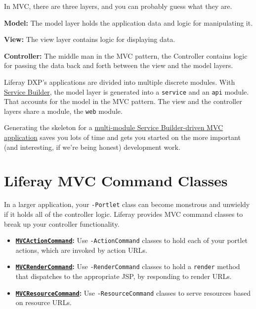 In MVC, there are three layers, and you can probably guess what they
are.

\textbf{Model:} The model layer holds the application data and logic for
manipulating it.

\textbf{View:} The view layer contains logic for displaying data.

\textbf{Controller:} The middle man in the MVC pattern, the Controller
contains logic for passing the data back and forth between the view and
the model layers.

Liferay DXP's applications are divided into multiple discrete modules.
With \href{/docs/7-2/appdev/-/knowledge_base/a/service-builder}{Service
Builder}, the model layer is generated into a \texttt{service} and an
\texttt{api} module. That accounts for the model in the MVC pattern. The
view and the controller layers share a module, the \texttt{web} module.

Generating the skeleton for a
\href{/docs/7-2/reference/-/knowledge_base/r/using-the-service-builder-template}{multi-module
Service Builder-driven MVC application} saves you lots of time and gets
you started on the more important (and interesting, if we're being
honest) development work.

\section{Liferay MVC Command Classes}\label{liferay-mvc-command-classes}

In a larger application, your \texttt{-Portlet} class can become
monstrous and unwieldy if it holds all of the controller logic. Liferay
provides MVC command classes to break up your controller functionality.

\begin{itemize}
\tightlist
\item
  \textbf{\href{https://docs.liferay.com/dxp/portal/7.2-latest/javadocs/portal-kernel/com/liferay/portal/kernel/portlet/bridges/mvc/MVCActionCommand.html}{\texttt{MVCActionCommand}}:}
  Use \texttt{-ActionCommand} classes to hold each of your portlet
  actions, which are invoked by action URLs.
\item
  \textbf{\href{https://docs.liferay.com/dxp/portal/7.2-latest/javadocs/portal-kernel/com/liferay/portal/kernel/portlet/bridges/mvc/MVCRenderCommand.html}{\texttt{MVCRenderCommand}}:}
  Use \texttt{-RenderCommand} classes to hold a \texttt{render} method
  that dispatches to the appropriate JSP, by responding to render URLs.
\item
  \textbf{\href{https://docs.liferay.com/dxp/portal/7.2-latest/javadocs/portal-kernel/com/liferay/portal/kernel/portlet/bridges/mvc/MVCResourceCommand.html}{\texttt{MVCResourceCommand}}:}
  Use \texttt{-ResourceCommand} classes to serve resources based on
  resource URLs.
\end{itemize}

